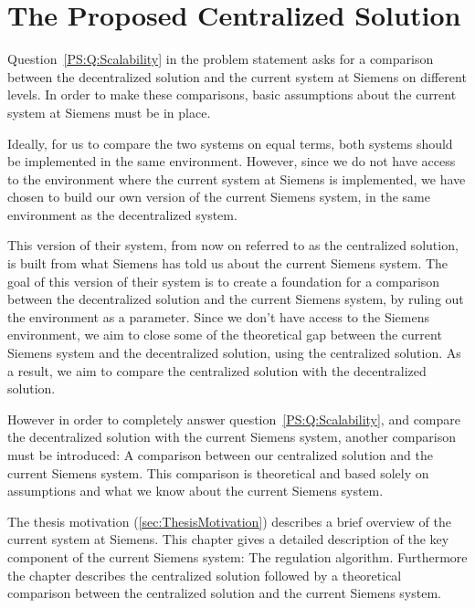 \chapter{The Proposed Centralized Solution}\label{cha:existingSystem}

Question~\ref{PS:Q:Scalability} in the problem statement asks for a comparison between the decentralized solution and the current system at Siemens on different levels. In order to make these comparisons, basic assumptions about the current system at Siemens must be in place. 

Ideally, for us to compare the two systems on equal terms, both systems should be implemented in the same environment. However, since we do not have access to the environment where the current system at Siemens is implemented, we have chosen to build our own version of the current Siemens system, in the same environment as the decentralized system.

This version of their system, from now on referred to as the centralized solution, is built from what Siemens has told us about the current Siemens system. The goal of this version of their system is to create a foundation for a comparison between the decentralized solution and the current Siemens system, by ruling out the environment as a parameter. Since we don't have access to the Siemens environment, we aim to close some of the theoretical gap between the current Siemens system and the decentralized solution, using the centralized solution. As a result, we aim to compare the centralized solution with the decentralized solution.

However in order to completely answer question~\ref{PS:Q:Scalability}, and compare the decentralized solution with the current Siemens system, another comparison must be introduced: A comparison between our centralized solution and the current Siemens system. This comparison is theoretical and based solely on assumptions and what we know about the current Siemens system. 

The thesis motivation (\cref{sec:ThesisMotivation}) describes a brief overview of the current system at Siemens. This chapter gives a detailed description of the key component of the current Siemens system: The regulation algorithm. Furthermore the chapter describes the centralized solution followed by a theoretical comparison between the centralized solution and the current Siemens system. 


